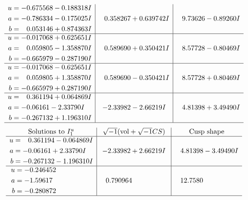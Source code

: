 \documentclass[1p]{elsarticle_modified}
\theoremstyle{definition}
\newcommand{\I}{\sqrt{-1}}
\begin{document}
$$\begin{array}{c|c|c}
\begin{aligned}
u &= -0.675568 - 0.188318 I \\
a &= -0.786334 - 0.175025 I \\
b &= \phantom{-}0.053146 + 0.874363 I\end{aligned}
 & \phantom{-}0.358267 + 0.639742 I & \phantom{-}9.73626 - 0.89260 I \\ \hline\begin{aligned}
u &= -0.017068 + 0.625651 I \\
a &= \phantom{-}0.059805 - 1.358870 I \\
b &= -0.665979 - 0.287190 I\end{aligned}
 & \phantom{-}0.589690 + 0.350421 I & \phantom{-}8.57728 - 0.80469 I \\ \hline\begin{aligned}
u &= -0.017068 - 0.625651 I \\
a &= \phantom{-}0.059805 + 1.358870 I \\
b &= -0.665979 + 0.287190 I\end{aligned}
 & \phantom{-}0.589690 - 0.350421 I & \phantom{-}8.57728 + 0.80469 I \\ \hline\begin{aligned}
u &= \phantom{-}0.361194 + 0.064869 I \\
a &= -0.06161 - 2.33790 I \\
b &= -0.267132 + 1.196310 I\end{aligned}
 & -2.33982 - 2.66219 I & \phantom{-}4.81398 + 3.49490 I\\
 \hline 
 \end{array}$$\newpage$$\begin{array}{c|c|c}  
\text{Solutions to }I^u_{1}& \I (\text{vol} + \sqrt{-1}CS) & \text{Cusp shape}\\
 \hline 
\begin{aligned}
u &= \phantom{-}0.361194 - 0.064869 I \\
a &= -0.06161 + 2.33790 I \\
b &= -0.267132 - 1.196310 I\end{aligned}
 & -2.33982 + 2.66219 I & \phantom{-}4.81398 - 3.49490 I \\ \hline\begin{aligned}
u &= -0.246452\phantom{ +0.000000I} \\
a &= -1.59617\phantom{ +0.000000I} \\
b &= -0.280872\phantom{ +0.000000I}\end{aligned}
 & \phantom{-}0.790964\phantom{ +0.000000I} & \phantom{-}12.7580\phantom{ +0.000000I}\\
 \hline 
 \end{array}$$\newpage\newpage\renewcommand{\arraystretch}{1}
\end{document}
